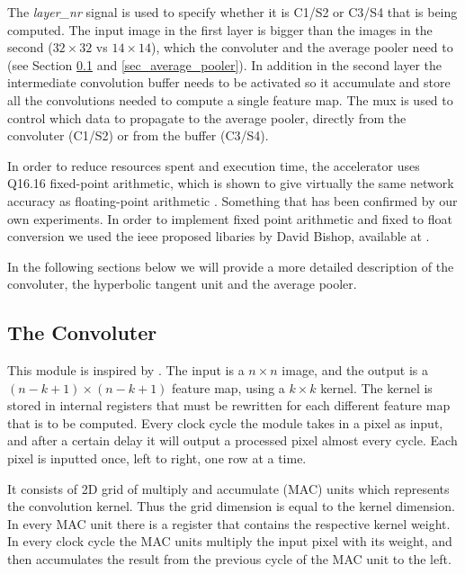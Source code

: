 The \textit{layer\_nr} signal is used to specify whether it is C1/S2 or C3/S4 that is being computed. The input image in the first layer is bigger than the images in the second ($ 32 \times 32 $ vs $ 14 \times 14 $), which the convoluter and the average pooler need to  (see Section \ref{sec_convoluter} and \ref{sec_average_pooler}). In addition in the second layer the intermediate convolution buffer needs to be activated so it accumulate and store all the convolutions needed to compute a single feature map. The mux is used to control which data to propagate to the average pooler, directly from the convoluter (C1/S2) or from the buffer (C3/S4). 

In order to reduce resources spent and execution time, the accelerator uses Q16.16 fixed-point arithmetic, which is shown to give virtually the same network accuracy as floating-point arithmetic\cite{Napocensis2009} \cite{Holt1993} \cite{Chen2014}. Something that has been confirmed by our own experiments. In order to implement fixed point arithmetic and fixed to float conversion we used the ieee proposed libaries by David Bishop, available at \cite{Bishop2015}.   

In the following sections below we will provide a more detailed description of the convoluter, the hyperbolic tangent unit and the average pooler. 


\subsection{The Convoluter} \label{sec_convoluter}

This module is inspired by \cite{Farabet2009}. The input is a $ n \times n $ image, and the output is a $ (n-k+1) \times (n-k+1) $ feature map, using a $ k \times k $ kernel. The kernel is stored in internal registers that must be rewritten for each different feature map that is to be computed. Every clock cycle the module takes in a pixel as input, and after a certain delay it will output a processed pixel almost every cycle. Each pixel is inputted once, left to right, one row at a time. 

It consists of 2D grid of multiply and accumulate (MAC) units which represents the convolution kernel. Thus the grid dimension is equal to the kernel dimension. In every MAC unit there is a register that contains the respective kernel weight. In every clock cycle the MAC units multiply the input pixel with its weight, and then accumulates the result from the previous cycle of the MAC unit to the left. 

